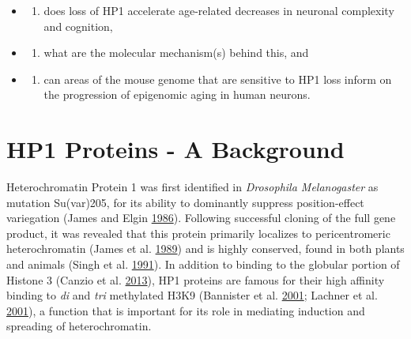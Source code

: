 \documentclass[onehalf,12pt]{beavtex}
\providecommand{\tightlist}{%
  \setlength{\itemsep}{0pt}\setlength{\parskip}{0pt}}
\begin{document}
  \begin{itemize}
  \item
    \begin{enumerate}
    \def\labelenumi{\alph{enumi})}
    \tightlist
    \item
      does loss of HP1 accelerate age-related decreases in neuronal
      complexity and cognition,
    \end{enumerate}
  \item
    \begin{enumerate}
    \def\labelenumi{\alph{enumi})}
    \setcounter{enumi}{1}
    \tightlist
    \item
      what are the molecular mechanism(s) behind this, and
    \end{enumerate}
  \item
    \begin{enumerate}
    \def\labelenumi{\alph{enumi})}
    \setcounter{enumi}{2}
    \tightlist
    \item
      can areas of the mouse genome that are sensitive to HP1 loss inform
      on the progression of epigenomic aging in human neurons.
    \end{enumerate}
  \end{itemize}
  
  \newpage
  
  \section{HP1 Proteins - A Background}\label{hp1-proteins---a-background}
  
  Heterochromatin Protein 1 was first identified in \emph{Drosophila
  Melanogaster} as mutation Su(var)205, for its ability to dominantly
  suppress position-effect variegation (James and Elgin
  \protect\hyperlink{ref-JamesIdentificationnonhistonechromosomal1986}{1986}).
  Following successful cloning of the full gene product, it was revealed
  that this protein primarily localizes to pericentromeric heterochromatin
  (James et al.
  \protect\hyperlink{ref-JamesDistributionpatternsHP11989}{1989}) and is
  highly conserved, found in both plants and animals (Singh et al.
  \protect\hyperlink{ref-Singhsequencemotiffound1991}{1991}). In addition
  to binding to the globular portion of Histone 3 (Canzio et al.
  \protect\hyperlink{ref-CanzioconformationalswitchHP12013}{2013}), HP1
  proteins are famous for their high affinity binding to \emph{di} and
  \emph{tri} methylated H3K9 (Bannister et al.
  \protect\hyperlink{ref-BannisterSelectiverecognitionmethylated2001}{2001};
  Lachner et al.
  \protect\hyperlink{ref-LachnerMethylationhistoneH32001}{2001}), a
  function that is important for its role in mediating induction and
  spreading of heterochromatin.
  
\end{document}
